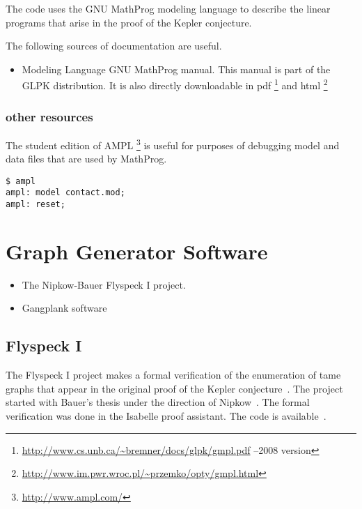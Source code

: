 The code uses the GNU MathProg modeling language to describe the linear programs that arise in the proof of the Kepler conjecture.

The following sources of documentation are useful.

\begin{itemize}
\item Modeling Language GNU MathProg manual.  This manual is part of the GLPK distribution.  It is also directly downloadable in pdf%
\footnote{\url{http://www.cs.unb.ca/~bremner/docs/glpk/gmpl.pdf} --2008 version} %
 and html%
\footnote{\url{http://www.im.pwr.wroc.pl/~przemko/opty/gmpl.html}} %
\end{itemize}

\subsection{other resources}

The student edition of AMPL%
\footnote{\url{http://www.ampl.com/}} %
is useful for 
purposes of debugging model and data files that are used by MathProg.

\begin{verbatim}
$ ampl
ampl: model contact.mod;
ampl: reset;
\end{verbatim}




\chapter{Graph Generator Software}


\begin{itemize}
\item The Nipkow-Bauer Flyspeck I project.
\item Gangplank software
\end{itemize}

\section{Flyspeck I}

The Flyspeck I project makes a formal verification of the enumeration
of tame graphs that appear in the original proof of the Kepler
conjecture~\cite{BauerN-AFP06}.  The project started with Bauer's
thesis under the direction of Nipkow~\cite{Bauer:2006:Thesis}.  The
formal verification was done in the Isabelle proof assistant.  The
code is available~\cite{BauerN-Flyspeck-I-Isabelle}.

